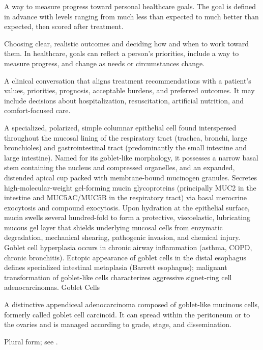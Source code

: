  A way to measure progress toward personal healthcare goals. The goal is defined in advance with levels ranging from much less than expected to much better than expected, then scored after treatment.

 Choosing clear, realistic outcomes and deciding how and when to work toward them. In healthcare, goals can reflect a person’s priorities, include a way to measure progress, and change as needs or circumstances change.

 A clinical conversation that aligns treatment recommendations with a patient's values,
priorities, prognosis, acceptable burdens, and preferred outcomes. It may include
decisions about hospitalization, resuscitation, artificial nutrition, and
comfort-focused care.

 A specialized, polarized, simple columnar epithelial cell found interspersed throughout the mucosal lining of the respiratory tract (trachea, bronchi, large bronchioles) and gastrointestinal tract (predominantly the small intestine and large intestine). Named for its goblet-like morphology, it possesses a narrow basal stem containing the nucleus and compressed organelles, and an expanded, distended apical cup packed with membrane-bound mucinogen granules. Secretes high-molecular-weight gel-forming mucin glycoproteins (principally MUC2 in the intestine and MUC5AC/MUC5B in the respiratory tract) via basal merocrine exocytosis and compound exocytosis. Upon hydration at the epithelial surface, mucin swells several hundred-fold to form a protective, viscoelastic, lubricating mucous gel layer that shields underlying mucosal cells from enzymatic degradation, mechanical shearing, pathogenic invasion, and chemical injury. Goblet cell hyperplasia occurs in chronic airway inflammation (asthma, COPD, chronic bronchitis). Ectopic appearance of goblet cells in the distal esophagus defines specialized intestinal metaplasia (Barrett esophagus); malignant transformation of goblet-like cells characterizes aggressive signet-ring cell adenocarcinomas.
\synonyms
Goblet Cells

 A distinctive appendiceal adenocarcinoma composed of goblet-like mucinous cells, formerly called goblet cell carcinoid. It can spread within the peritoneum or to the ovaries and is managed according to grade, stage, and dissemination.

 Plural form; see .

